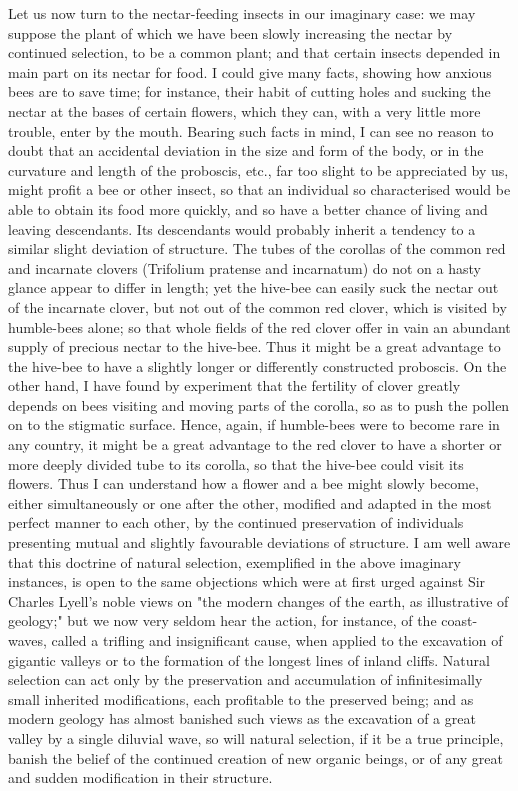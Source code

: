 Let us now turn to the nectar-feeding insects in our imaginary case: we may suppose the plant of which we have been slowly increasing the nectar by continued selection, to be a common plant; and that certain insects depended in main part on its nectar for food. I could give many facts, showing how anxious bees are to save time; for instance, their habit of cutting holes and sucking the nectar at the bases of certain flowers, which they can, with a very little more trouble, enter by the mouth. Bearing such facts in mind, I can see no reason to doubt that an accidental deviation in the size and form of the body, or in the curvature and length of the proboscis, etc., far too slight to be appreciated by us, might profit a bee or other insect, so that an individual so characterised would be able to obtain its food more quickly, and so have a better chance of living and leaving descendants. Its descendants would probably inherit a tendency to a similar slight deviation of structure. The tubes of the corollas of the common red and incarnate clovers (Trifolium pratense and incarnatum) do not on a hasty glance appear to differ in length; yet the hive-bee can easily suck the nectar out of the incarnate clover, but not out of the common red clover, which is visited by humble-bees alone; so that whole fields of the red clover offer in vain an abundant supply of precious nectar to the hive-bee. Thus it might be a great advantage to the hive-bee to have a slightly longer or differently constructed proboscis. On the other hand, I have found by experiment that the fertility of clover greatly depends on bees visiting and moving parts of the corolla, so as to push the pollen on to the stigmatic surface. Hence, again, if humble-bees were to become rare in any country, it might be a great advantage to the red clover to have a shorter or more deeply divided tube to its corolla, so that the hive-bee could visit its flowers. Thus I can understand how a flower and a bee might slowly become, either simultaneously or one after the other, modified and adapted in the most perfect manner to each other, by the continued preservation of individuals presenting mutual and slightly favourable deviations of structure.
I am well aware that this doctrine of natural selection, exemplified in the above imaginary instances, is open to the same objections which were at first urged against Sir Charles Lyell's noble views on "the modern changes of the earth, as illustrative of geology;" but we now very seldom hear the action, for instance, of the coast-waves, called a trifling and insignificant cause, when applied to the excavation of gigantic valleys or to the formation of the longest lines of inland cliffs. Natural selection can act only by the preservation and accumulation of infinitesimally small inherited modifications, each profitable to the preserved being; and as modern geology has almost banished such views as the excavation of a great valley by a single diluvial wave, so will natural selection, if it be a true principle, banish the belief of the continued creation of new organic beings, or of any great and sudden modification in their structure.

